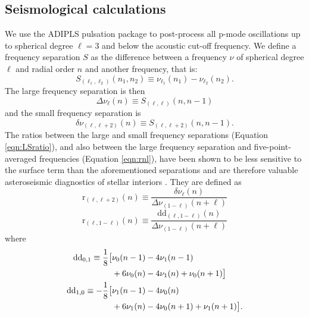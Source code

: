 \documentclass[manuscript]{aastex}
\begin{document}
\subsection{Seismological calculations}
\label{sec:seis}
We use the ADIPLS pulsation package \citep{2008Ap&SS.316..113C} to post-process all p-mode oscillations up to spherical degree $\ell=3$ and below the acoustic cut-off frequency. We define a frequency separation $S$ as the difference between a frequency $\nu$ of spherical degree $\ell$ and radial order $n$ and another frequency, that is:
\begin{equation} 
  S_{(\ell_1, \ell_2)}(n_1, n_2) \equiv \nu_{\ell_1}(n_1) - \nu_{\ell_2}(n_2).
\end{equation}
The large frequency separation is then
\begin{equation} 
  \Delta\nu_\ell(n) \equiv S_{(\ell, \ell)}(n, n-1)
\end{equation}
and the small frequency separation is
\begin{equation}
  \delta\nu_{(\ell, \ell+2)}(n) \equiv S_{(\ell, \ell+2)}(n, n-1).
\end{equation}
The ratios between the large and small frequency separations (Equation \ref{eqn:LSratio}), and also between the large frequency separation and five-point-averaged frequencies (Equation \ref{eqn:rnl}), have been shown to be less sensitive to the surface term than the aforementioned separations and are therefore valuable asteroseismic diagnostics of stellar interiors \citep{2003A&A...411..215R}. They are defined as
\begin{equation} 
  \mathrm{r}_{(\ell,\ell+2)}(n) \equiv \frac{\delta\nu_\ell(n)}{\Delta\nu_{(1-\ell)}(n+\ell)} \label{eqn:LSratio}
\end{equation}
\begin{equation} 
  \mathrm{r}_{(\ell, 1-\ell)}(n) \equiv \frac{\mathrm{dd}_{(\ell,1-\ell)}(n)}{\Delta\nu_{(1-\ell)}(n+\ell)} \label{eqn:rnl}
\end{equation}
where
\begin{align} 
  \mathrm{dd}_{0,1} \equiv \frac{1}{8} \big[&\nu_0(n-1) - 4\nu_1(n-1) \notag\\
                                 &+6\nu_0(n) - 4\nu_1(n) + \nu_0(n+1)\big]\\ 
  \mathrm{dd}_{1,0} \equiv -\frac{1}{8} \big[&\nu_1(n-1) - 4\nu_0(n) \notag\\
                                 &+6\nu_1(n) - 4\nu_0(n+1) + \nu_1(n+1)\big].
\end{align}
\end{document}
